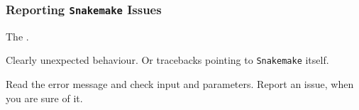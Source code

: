\begin{frame}
  \frametitle{Reporting \texttt{Snakemake} Issues}
  \begin{question}[Where to?]
  	 The .
  \end{question}	
  \pause
  \begin{question}[What?]
  	Clearly unexpected behaviour. Or tracebacks pointing to \texttt{Snakemake} itself. 
  \end{question}
  \pause
  \begin{question}[How?]
  	Read the error message and check input and parameters. Report an issue, when you are sure of it.
  \end{question}
\end{frame}

